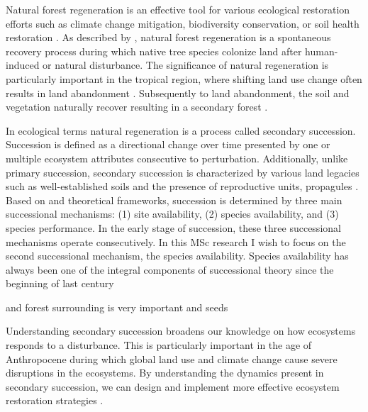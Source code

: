 Natural forest regeneration is an effective tool for various ecological restoration efforts such as climate change mitigation, biodiversity conservation, or soil health restoration \citep{hordijkLandUseHistory2024}. %
As described by \citet{crouzeillesEcologicalRestorationSuccess2017}, natural forest regeneration is a spontaneous recovery process during which native tree species colonize land after human-induced or natural disturbance.
The significance of natural regeneration is particularly important in the tropical region, where shifting land use change often results in land abandonment \citep{chazdonSecondGrowthPromise2014}. %
Subsequently to land abandonment, the soil and vegetation naturally recover resulting in a secondary forest \citep{hordijkLandUseHistory2024}. %

In ecological terms natural regeneration is a process called secondary succession. Succession is defined as a directional change over time presented by one or multiple ecosystem attributes consecutive to perturbation. Additionally, unlike primary succession, secondary succession is characterized by various land legacies such as well-established soils and the presence of reproductive units, propagules \citep{poorterSuccessionalTheories2023}. %
Based on \citet{pickettHierarchicalConsiderationCauses1987} and \citet{poorterComprehensiveFrameworkVegetation2024} theoretical frameworks, succession is determined by three main successional mechanisms: (1) site availability, (2) species availability, and (3) species performance. In the early stage of succession, these three successional mechanisms operate consecutively. In this MSc research I wish to focus on the second successional mechanism, the species availability. Species availability has always been one of the integral components of successional theory since the beginning of last century \citep{}


and forest surrounding is very important and seeds

Understanding secondary succession broadens our knowledge on how ecosystems responds to a disturbance. This is particularly important in the age of Anthropocene during which global land use and climate change cause severe disruptions in the ecosystems. By understanding the dynamics present in secondary succession, we can design and implement more effective ecosystem restoration strategies \cite{poorterSuccessionalTheories2023}.

